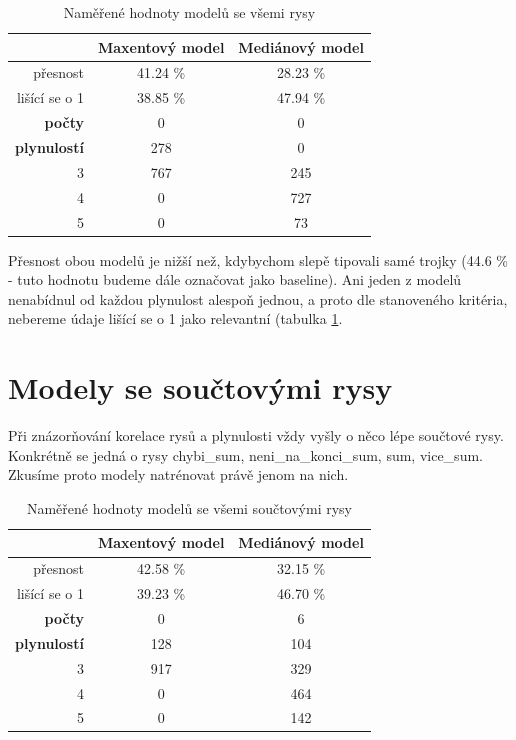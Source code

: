 \documentclass[12pt,a4paper]{report}
\begin{document}
\begin{table}[!htbp]
\begin{center}
\begin{tabular}{|r|c|c|}
\hline
 & \textbf{Maxentový model} & \textbf{Mediánový model} \\
 \hline
přesnost & 41.24 \%  & 28.23 \%  \\
\hline
lišící se o 1 & 38.85 \% & 47.94 \%  \\
\hline
\textbf{počty} \quad 1 & \color{red}0 & \color{red}0 \\
\textbf{plynulostí} \quad 2 & 278 & \color{red}0 \\
 3 & 767 & 245 \\
 4 & \color{red}0 & 727 \\
 5 & \color{red}0 & 73 \\
\hline
\end{tabular}
\caption{Naměřené hodnoty modelů se všemi rysy}\label{tb:all}
\end{center}
\end{table}

Přesnost obou modelů je nižší než, kdybychom slepě tipovali samé trojky (44.6 \% - tuto hodnotu budeme dále označovat jako baseline). Ani jeden z modelů nenabídnul od každou plynulost alespoň jednou, a proto dle stanoveného kritéria, nebereme údaje lišící se o 1 jako relevantní (tabulka \ref{tb:all}.


\section{Modely se součtovými rysy}
Při znázorňování korelace rysů a plynulosti vždy vyšly o něco lépe součtové rysy. Konkrétně se jedná o rysy chybi\_sum, neni\_na\_konci\_sum, sum, vice\_sum. Zkusíme proto modely natrénovat právě jenom na nich. 

\begin{table}[!htbp]
\begin{center}
\begin{tabular}{|r|c|c|}
\hline
 & \textbf{Maxentový model} & \textbf{Mediánový model} \\
 \hline
     přesnost & 42.58 \%  & 32.15 \%  \\
\hline
lišící se o 1 & 39.23 \% & 46.70 \%  \\
\hline
     \textbf{počty} \quad 1 & \color{red}0   & \color{OliveGreen}6   \\
\textbf{plynulostí} \quad 2 & 128 & \color{OliveGreen}104   \\
                          3 & 917 & \color{OliveGreen}329 \\
                          4 & \color{red}0   & \color{OliveGreen}464 \\
                          5 & \color{red}0   & \color{OliveGreen}142  \\
\hline
\end{tabular}
\caption{Naměřené hodnoty modelů se všemi součtovými rysy}\label{tb:allsums}
\end{center}
\end{table}
\end{document}
